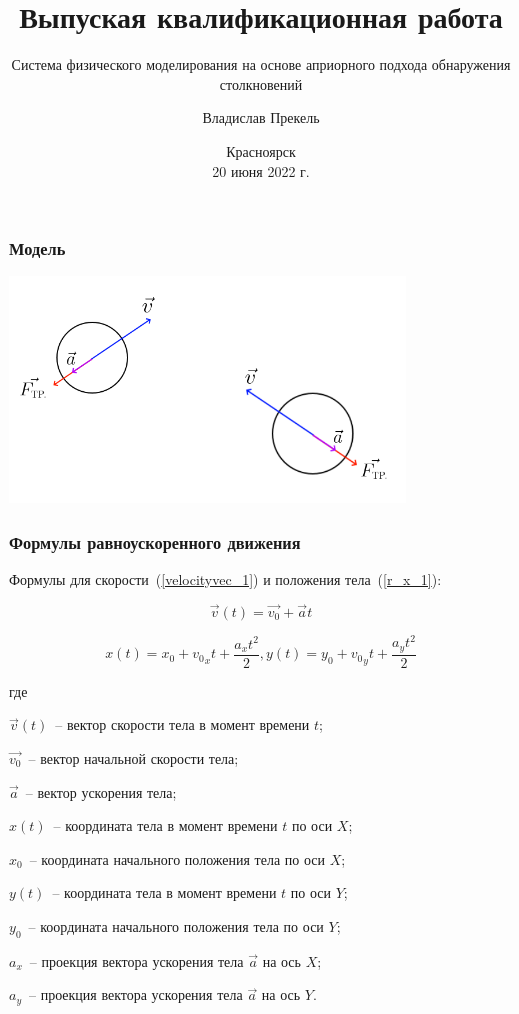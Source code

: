 \documentclass[xetex,aspectratio=43]{beamer}
\title{Выпуская квалификационная работа}
\subtitle{Система физического моделирования на основе априорного подхода обнаружения столкновений}
\author{Владислав Прекель}
\institute{ИКИТ СФУ\\КИ18-16б}
\date{Красноярск\\20 июня 2022 г.}
\newenvironment{Underequation}{
    \small
    \noindent
    где
    \hspace{-1.45ex}
    \setlength{\parindent}{3.5ex}
}{}
\begin{document}
\begin{frame}
    \titlepage
\end{frame}

\begin{frame}
    \frametitle{Модель}

    \includegraphics[height=6cm]{body_init}

\end{frame}

\begin{frame}
    \frametitle{Формулы равноускоренного движения}
    Формулы для скорости~(\ref{velocityvec_1}) и положения тела~(\ref{r_x_1}):

    \begin{equation}\label{velocityvec_1}
        \vec{v}(t) = \vec{v_0} + \vec{a}t
    \end{equation}

    \begin{equation}\label{r_x_1}
        x(t) = x_0 + {v_0}_x t + \frac{a_x t^2}{2},
        y(t) = y_0 + {v_0}_y t + \frac{a_y t^2}{2}
    \end{equation}


    \begin{Underequation}
        \(\vec{v}(t)\)~-- вектор скорости тела в момент времени \(t\);

        \(\vec{v_0}\)~-- вектор начальной скорости тела;

        \(\vec{a}\)~-- вектор ускорения тела;

        \(x(t)\)~-- координата тела в момент времени \(t\) по оси \(X\);

        \(x_0\)~-- координата начального положения тела по оси \(X\);

        \(y(t)\)~-- координата тела в момент времени \(t\) по оси \(Y\);

        \(y_0\)~-- координата начального положения тела по оси \(Y\);

        \(a_x\)~-- проекция вектора ускорения тела \(\vec{a}\) на ось \(X\);

        \(a_y\)~-- проекция вектора ускорения тела \(\vec{a}\) на ось \(Y\).
    \end{Underequation}
\end{frame}
\end{document}
